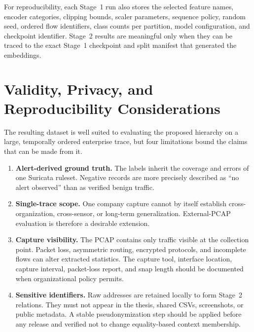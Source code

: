 \documentclass[11pt,fleqn]{report}
\begin{document}
For reproducibility, each Stage~1 run also stores the selected feature names,
encoder categories, clipping bounds, scaler parameters, sequence policy,
random seed, ordered flow identifiers, class counts per partition, model
configuration, and checkpoint identifier. Stage~2 results are meaningful only
when they can be traced to the exact Stage~1 checkpoint and split manifest that
generated the embeddings.

\section{Validity, Privacy, and Reproducibility Considerations}
\label{subsec:dataset_limitations}

The resulting dataset is well suited to evaluating the proposed hierarchy on
a large, temporally ordered enterprise trace, but four limitations bound the
claims that can be made from it.

\begin{enumerate}[label=\textbf{L\arabic*:},leftmargin=*]
    \item \textbf{Alert-derived ground truth.} The labels inherit the coverage
    and errors of one Suricata ruleset. Negative records are more precisely
    described as ``no alert observed'' than as verified benign traffic.

    \item \textbf{Single-trace scope.} One company capture cannot by itself
    establish cross-organization, cross-sensor, or long-term generalization.
    External-PCAP evaluation is therefore a desirable extension.

    \item \textbf{Capture visibility.} The PCAP contains only traffic visible
    at the collection point. Packet loss, asymmetric routing, encrypted
    protocols, and incomplete flows can alter extracted statistics. The
    capture tool, interface location, capture interval, packet-loss report, and
    snap length should be documented when organizational policy permits.

    \item \textbf{Sensitive identifiers.} Raw addresses are retained locally
    to form Stage~2 relations. They must not appear in the thesis, shared CSVs,
    screenshots, or public metadata. A stable pseudonymization step should be
    applied before any release and verified not to change equality-based
    context membership.
\end{enumerate}
\end{document}
